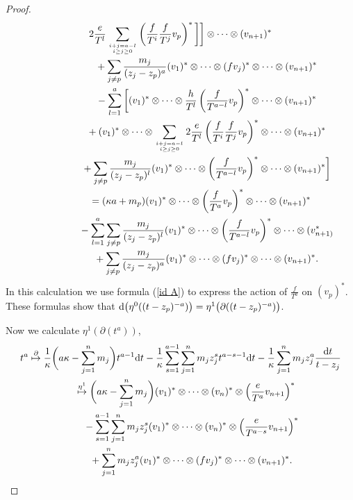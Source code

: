 \documentclass[pdftex]{sigma}
\numberwithin{equation}{section}
\begin{document}
\begin{proof}
\begin{gather*}
2\frac{e}{T^l}\sum_{i+j=a-l \atop i\geq j\geq 0 } \left(\frac{f}{T^i}\frac{f}{T^j} v_p\right)^*\bigg] \bigg] \otimes\dots\otimes (v_{n+1})^* \nonumber \\
\hphantom{\frac1{(t-z_p)^{a}} \overset{\eta^0}\mapsto}{} + \sum_{j\neq p} \frac{m_j}{(z_j-z_p)^a} (v_1)^* \otimes\dots\otimes (fv_j)^* \otimes\dots\otimes (v_{n+1})^* \nonumber \\
\hphantom{\frac1{(t-z_p)^{a}} \overset{\eta^0}\mapsto}{}
 - \sum_{l=1}^a \bigg[ (v_1)^* \otimes\dots\otimes \frac{h}{T^l}\left(\frac{f}{T^{a-l}}v_p \right)^* \otimes\dots\otimes (v_{n+1})^* \nonumber \\
\hphantom{\frac1{(t-z_p)^{a}} \overset{\eta^0}\mapsto}{} + (v_1)^* \otimes\dots\otimes \sum_{i+j=a-l \atop i\geq j\geq 0} 2\frac{e}{T^l} \left(\frac{f}{T^i}\frac{f}{T^j}v_p\right)^*\otimes\dots\otimes (v_{n+1})^*
\nonumber \\
\hphantom{\frac1{(t-z_p)^{a}} \overset{\eta^0}\mapsto}{} + \sum_{j \neq p} \frac{m_j}{(z_j-z_p)^l} (v_1)^* \otimes\dots\otimes \left(\frac{f}{T^{a-l}} v_p \right)^* \otimes\dots\otimes (v_{n+1})^* \bigg] \nonumber \\
\hphantom{\frac1{(t-z_p)^{a}}}{} = (\kappa a + m_p) (v_1)^* \otimes\dots\otimes\left(\frac{f}{T^a}v_p \right)^* \otimes\dots\otimes (v_{n+1})^* \nonumber \\
\hphantom{\frac1{(t-z_p)^{a}} \overset{\eta^0}\mapsto}{} - \sum_{l=1}^a \sum_{j \neq p} \frac{m_j}{(z_j-z_p)^l} (v_1)^* \otimes\dots\otimes \left(\frac{f}{T^{a-l}} v_p \right)^* \otimes\dots\otimes
(v_{n+1)}^* \nonumber \\
\hphantom{\frac1{(t-z_p)^{a}} \overset{\eta^0}\mapsto}{} + \sum_{j\neq p} \frac{ m_j}{(z_j-z_p)^a} (v_1)^* \otimes\dots\otimes (fv_j)^* \otimes\dots\otimes (v_{n+1})^*.
\end{gather*}
In this calculation we use formula (\ref{id A}) to express the action of $\frac{f}{T^a}$ on $(v_{p})^*$. These formulas show that ${\rm d}\big(\eta^0((t-z_p)^{-a})\big) = \eta^1\big(\partial((t-z_p)^{-a})\big)$.

Now we calculate $\eta^1(\partial(t^a))$,
\begin{gather*}
t^a \overset{\partial}{\mapsto} \frac{1}{\kappa}\bigg(a\kappa - \sum_{j=1}^n m_j\bigg) t^{a-1} {\rm d}t - \frac{1}{\kappa} \sum_{s=1}^{a-1} \sum_{j=1}^n m_j z_j^s
t^{a-s-1} {\rm d}t - \frac{1}{\kappa} \sum_{j=1}^n m_j z_j^a \frac{{\rm d}t}{t-z_j} \nonumber \\
\hphantom{t^a}{} \overset{\eta^1}{\mapsto} \bigg(a\kappa - \sum_{j=1}^n m_j\bigg) (v_1)^* \otimes \dots \otimes (v_n)^* \otimes \left(\frac{e}{T^a} v_{n+1}\right)^*\nonumber \\
\hphantom{t^a \overset{\partial}{\mapsto}}{}- \sum_{s=1}^{a-1} \sum_{j=1}^n m_j z_j^s (v_1)^* \otimes \dots \otimes (v_n)^* \otimes \left(\frac{e}{T^{a-s}} v_{n+1}\right)^* \nonumber \\
\hphantom{t^a \overset{\partial}{\mapsto}}{} + \sum_{j=1}^n m_j z_j^a (v_1)^* \otimes \dots \otimes (f v_j)^* \otimes\dots\otimes (v_{n+1})^*.
\end{gather*}


\end{proof}
\end{document}
